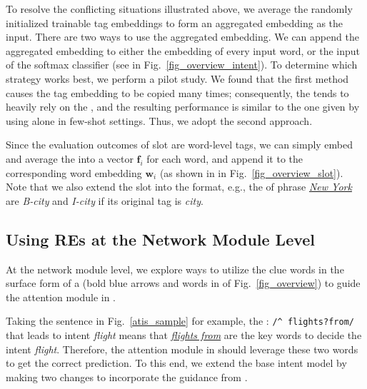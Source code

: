 To resolve the conflicting situations illustrated above, we average the randomly initialized trainable tag embeddings to form an aggregated
embedding as the \NN input. There are two ways to use the aggregated embedding. We can  append the aggregated embedding to either the
embedding of every input word, or the input of the softmax classifier (see  in Fig.~\ref{fig_overview_intent}). To determine
which strategy works best, we perform a pilot study. We found that the first method causes the tag embedding to be copied many times;
consequently, the \NN tends to heavily rely on the \REtags, and the resulting performance is similar to the one given by using \REs alone
in few-shot settings. Thus, we adopt the second approach.

 Since the evaluation outcomes of slot \REs are word-level tags,
we can simply embed and average the \REtags into a vector $\textbf{f}_i$ for each word, and append it
to the corresponding word embedding $\textbf{w}_i$ (as shown in  in Fig.~\ref{fig_overview_slot}).
Note that we also extend the slot \REtags into the \BIO format, e.g., the \REtags of phrase \textsl{\underline{New York}} are \emph{B-city} and \emph{I-city} if its original tag is \emph{city}.

\subsection{Using REs at the Network Module Level}
\label{interact_with_module} At the network module level, we explore ways to utilize the clue words in the surface form of a \RE (bold blue arrows and
words in  of Fig.~\ref{fig_overview}) to guide the attention module in \NNs.


 Taking the sentence in Fig.~\ref{atis_sample} for example, the \RE: {\small\texttt{/\textasciicircum
flights?\:from/} } that leads to intent \emph{flight} means that \textsl{\underline{flights from}} are the key words to decide the intent
\emph{flight}. Therefore, the attention module in \NNs should leverage these two words to get the correct prediction. To this end, we
extend the base intent model by making two changes to incorporate the guidance from \REs.

